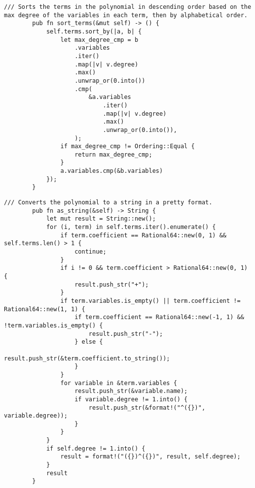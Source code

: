     \begin{lstlisting}[caption={The implementation of the \texttt{sort\_terms()} method for the \texttt{Polynomial} struct}, label={lst:polynomial-sort-terms}]
        /// Sorts the terms in the polynomial in descending order based on the max degree of the variables in each term, then by alphabetical order.
        pub fn sort_terms(&mut self) -> () {
            self.terms.sort_by(|a, b| {
                let max_degree_cmp = b
                    .variables
                    .iter()
                    .map(|v| v.degree)
                    .max()
                    .unwrap_or(0.into())
                    .cmp(
                        &a.variables
                            .iter()
                            .map(|v| v.degree)
                            .max()
                            .unwrap_or(0.into()),
                    );
                if max_degree_cmp != Ordering::Equal {
                    return max_degree_cmp;
                }
                a.variables.cmp(&b.variables)
            });
        }
    \end{lstlisting}

    \begin{lstlisting}[caption={The implementation of the \texttt{as\_string()} method for the \texttt{Polynomial} struct}, label={lst:polynomial-as-string}]
        /// Converts the polynomial to a string in a pretty format.
        pub fn as_string(&self) -> String {
            let mut result = String::new();
            for (i, term) in self.terms.iter().enumerate() {
                if term.coefficient == Rational64::new(0, 1) && self.terms.len() > 1 {
                    continue;
                }
                if i != 0 && term.coefficient > Rational64::new(0, 1) {
                    result.push_str("+");
                }
                if term.variables.is_empty() || term.coefficient != Rational64::new(1, 1) {
                    if term.coefficient == Rational64::new(-1, 1) && !term.variables.is_empty() {
                        result.push_str("-");
                    } else {
                        result.push_str(&term.coefficient.to_string());
                    }
                }
                for variable in &term.variables {
                    result.push_str(&variable.name);
                    if variable.degree != 1.into() {
                        result.push_str(&format!("^({})", variable.degree));
                    }
                }
            }
            if self.degree != 1.into() {
                result = format!("({})^({})", result, self.degree);
            }
            result
        }
    \end{lstlisting}

